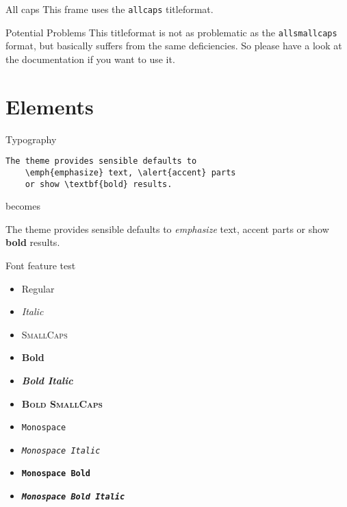 \documentclass[10pt]{beamer}
\begin{document}
{
\begin{frame}{All caps}
  This frame uses the \texttt{allcaps} titleformat.

  \begin{alertblock}{Potential Problems}
    This titleformat is not as problematic as the \texttt{allsmallcaps} format, but basically suffers from the same deficiencies. So please have a look at the documentation if you want to use it.
  \end{alertblock}
\end{frame}
}

\section{Elements}

\begin{frame}[fragile]{Typography}
  \begin{verbatim}The theme provides sensible defaults to
    \emph{emphasize} text, \alert{accent} parts
    or show \textbf{bold} results.\end{verbatim}

    \begin{center}becomes\end{center}

      The theme provides sensible defaults to \emph{emphasize} text,
      \alert{accent} parts or show \textbf{bold} results.
    \end{frame}

    \begin{frame}{Font feature test}
      \begin{itemize}
        \item Regular
        \item \textit{Italic}
        \item \textsc{SmallCaps}
        \item \textbf{Bold}
        \item \textbf{\textit{Bold Italic}}
        \item \textbf{\textsc{Bold SmallCaps}}
        \item \texttt{Monospace}
        \item \texttt{\textit{Monospace Italic}}
        \item \texttt{\textbf{Monospace Bold}}
        \item \texttt{\textbf{\textit{Monospace Bold Italic}}}
      \end{itemize}
    \end{frame}
\end{document}
